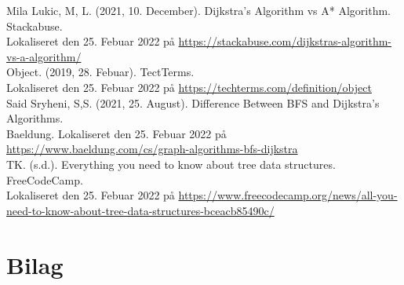 \documentclass[12pt]{article}
\begin{document}
Mila Lukic, M, L. (2021, 10. December). Dijkstra's Algorithm vs A* Algorithm. Stackabuse. \\Lokaliseret den 25. Febuar 2022 på \href{https://stackabuse.com/dijkstras-algorithm-vs-a-algorithm/}{https://stackabuse.com/dijkstras-algorithm-vs-a-algorithm/}\\

Object. (2019, 28. Febuar). TectTerms. \\Lokaliseret den 25. Febuar 2022 på \href{https://techterms.com/definition/object}{https://techterms.com/definition/object}\\

Said Sryheni, S,S. (2021, 25. August). Difference Between BFS and Dijkstra’s Algorithms.\\ Baeldung. Lokaliseret den 25. Febuar 2022 på \href{https://www.baeldung.com/cs/graph-algorithms-bfs-dijkstra}{https://www.baeldung.com/cs/graph-algorithms-bfs-dijkstra}\\

TK. (s.d.). Everything you need to know about tree data structures. FreeCodeCamp. \\Lokaliseret den 25. Febuar 2022 på \href{https://www.freecodecamp.org/news/all-you-need-to-know-about-tree-data-structures-bceacb85490c/}{https://www.freecodecamp.org/news/all-you-need-to-know-about-tree-data-structures-bceacb85490c/}\\



\newpage
\section{Bilag}
\end{document}
